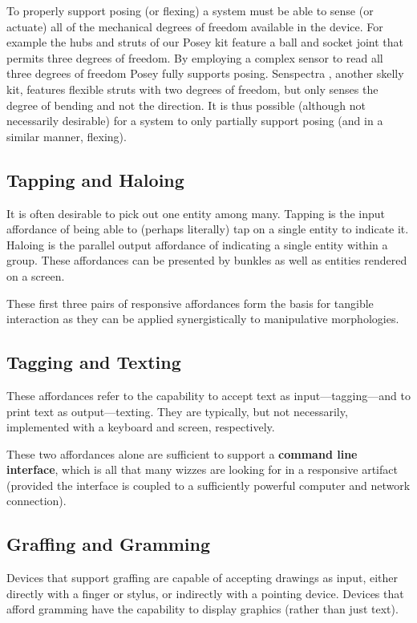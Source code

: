 To properly support posing (or flexing) a system must be able to sense (or actuate) all of the mechanical degrees of freedom available in the device. For example the hubs and struts of our Posey kit feature a ball and socket joint that permits three degrees of freedom. By employing a complex sensor to read all three degrees of freedom Posey fully supports posing. Senspectra \cite{senspectra}, another skelly kit, features flexible struts with two degrees of freedom, but only senses the degree of bending and not the direction. It is thus possible (although not necessarily desirable) for a system to only partially support posing (and in a similar manner, flexing).

\subsection{Tapping and Haloing}
%
It is often desirable to pick out one entity among many. Tapping is the input affordance of being able to (perhaps literally) tap on a single entity to indicate it. Haloing is the parallel output affordance of indicating a single entity within a group. These affordances can be presented by bunkles as well as entities rendered on a screen.

These first three pairs of responsive affordances form the basis for tangible interaction as they can be applied synergistically to manipulative morphologies.

\subsection{Tagging and Texting}
%
These affordances refer to the capability to accept text as input---tagging---and to print text as output---texting. They are typically, but not necessarily, implemented with a keyboard and screen, respectively.

These two affordances alone are sufficient to support a \textbf{command line interface}, which is all that many wizzes are looking for in a responsive artifact (provided the interface is coupled to a sufficiently powerful computer and network connection).

\subsection{Graffing and Gramming}
%
Devices that support graffing are capable of accepting drawings as input, either directly with a finger or stylus, or indirectly with a pointing device. Devices that afford gramming have the capability to display graphics (rather than just text).

